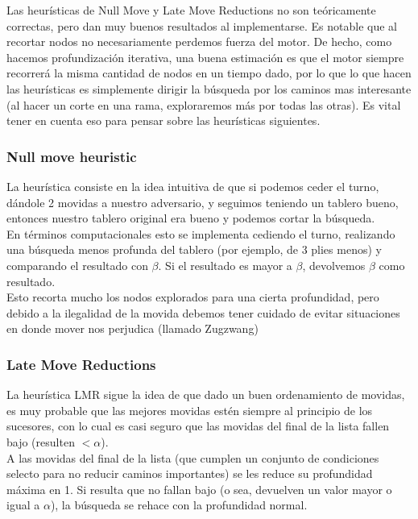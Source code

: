 \documentclass{article}
\begin{document}
Las heurísticas de Null Move y Late Move Reductions no son
teóricamente correctas, pero dan muy buenos resultados al
implementarse. Es notable que al recortar nodos no necesariamente
perdemos fuerza del motor. De hecho, como hacemos profundización
iterativa, una buena estimación es que el motor siempre recorrerá
la misma cantidad de nodos en un tiempo dado, por lo que lo que hacen
las heurísticas es simplemente dirigir la búsqueda por los caminos
mas interesante (al hacer un corte en una rama, exploraremos más por
todas las otras). Es vital tener en cuenta eso para pensar sobre las
heurísticas siguientes.

\subsubsection{Null move heuristic}
La heurística consiste en la idea intuitiva de que si podemos ceder el
turno, dándole 2 movidas a nuestro adversario, y seguimos teniendo un
tablero bueno, entonces nuestro tablero original era bueno y podemos
cortar la búsqueda.
\\

En términos computacionales esto se implementa cediendo el turno,
realizando una búsqueda menos profunda del tablero (por ejemplo, de 3
plies menos) y comparando el resultado con $\beta$. Si el resultado es
mayor a $\beta$, devolvemos $\beta$ como resultado.
\\

Esto recorta mucho los nodos explorados para una cierta profundidad,
pero debido a la ilegalidad de la movida debemos tener cuidado de evitar
situaciones en donde mover nos perjudica (llamado Zugzwang)

\subsubsection{Late Move Reductions}
La heurística LMR sigue la idea de que dado un buen ordenamiento de
movidas, es muy probable que las mejores movidas estén siempre al
principio de los sucesores, con lo cual es casi seguro que las movidas
del final de la lista fallen bajo (resulten $< \alpha$).
\\

A las movidas del final de la lista (que cumplen un conjunto de
condiciones selecto para no reducir caminos importantes) se les reduce
su profundidad máxima en 1. Si resulta que no fallan bajo (o sea,
devuelven un valor mayor o igual a $\alpha$), la búsqueda se rehace con
la profundidad normal.
\end{document}
